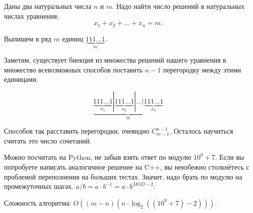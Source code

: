 \solutionSection

Даны два натуральных числа $n$ и $m$. Надо найти число решений в натуральных числах уравнения:
$$x_1 + x_2 + \dots + x_n = m.$$

Выпишем в ряд $m$ единиц $\underbrace{111\dots 1}_m$.

Заметим, существует биекция из множества решений нашего уравнения в множество всевозможных способов поставить $n-1$ перегородку между этими единицами.

$$\underbrace{\underbrace{111\dots 1}_{x_1}|\underbrace{111\dots 1}_{x_2}|\dots|\underbrace{111\dots 1}_{x_n}}_m$$

Способов так расставить перегородки, очевидно $C_{m-1}^{n-1}$. Осталось научиться считать это число сочетаний.

Можно посчитать на Python, не забыв взять ответ по модулю $10^9+7$. Если вы попробуете написать аналогичное решение на C++, вы неизбежно столкнётесь с проблемой переполнения на больших тестах. Значит, надо брать по модулю на промежуточных шагах. $a/b = a\cdot b^{-1} = a\cdot b ^ {MOD - 2}$.

Сложность алгоритма: $O((m-n)(n\cdot\log_2{((10^9+7)-2)}))$.

\codeExample

